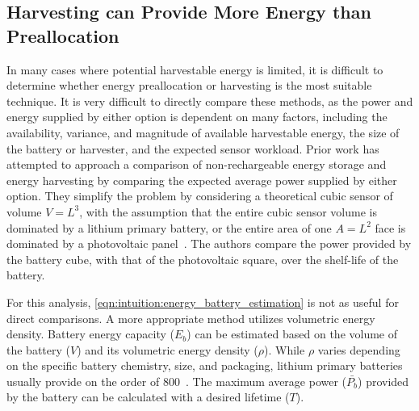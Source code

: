 \subsection{Harvesting can Provide More Energy than Preallocation}
\label{sec:intuition:energy_income_pvh}
In many cases where potential harvestable energy is limited, it is difficult to determine whether energy preallocation or harvesting is the most suitable technique.
It is very difficult to directly compare these methods, as the power and energy supplied by either option is dependent on many factors, including the availability, variance, and magnitude of available harvestable energy, the size of the battery or harvester, and the expected sensor workload. 
Prior work has attempted to approach a comparison of non-rechargeable energy storage and energy harvesting by comparing the expected average power supplied by either option. 
They simplify the problem by considering a theoretical cubic sensor of volume $V = L^3$, 
with the assumption that the entire cubic sensor volume is dominated by a lithium primary battery, or the entire area of one $A = L^2$ face is dominated by a photovoltaic panel~\cite{yervaGrafting12}.
The authors compare the power provided by the battery cube, with that of the photovoltaic square, over the shelf-life of the battery. 

For this analysis, \cref{eqn:intuition:energy_battery_estimation} is not as useful for direct comparisons. 
A more appropriate method utilizes volumetric energy density.
Battery energy capacity ($E_b$) can be estimated based on the volume of the battery ($V$) and its volumetric energy density ($\rho$).
While $\rho$ varies depending on the specific battery chemistry, size, and packaging, lithium primary batteries usually provide on the order of 800\ssi[per-mode=symbol]{\milli\Wh\per\cm\cubed}~\cite{tuna2016energy}. The maximum average power ($\bar{P_b}$) provided by the battery can be calculated with a desired lifetime ($T$). 


